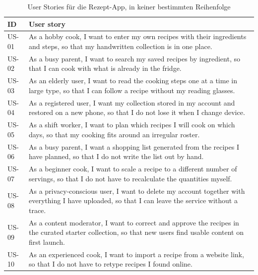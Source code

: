 \begin{table}[H]
  \centering
  \caption{User Stories für die Rezept-App, in keiner bestimmten Reihenfolge}
  \label{tab:user-stories}
  \tablefontsize
  \begin{tabular}{@{}p{1.2cm}p{13.5cm}@{}}
    \toprule
    \textbf{ID} & \textbf{User story} \\
    \midrule
    US-01 & As a hobby cook, I want to enter my own recipes with their
            ingredients and steps, so that my handwritten collection is in one
            place. \\
    US-02 & As a busy parent, I want to search my saved recipes by ingredient,
            so that I can cook with what is already in the fridge. \\
    US-03 & As an elderly user, I want to read the cooking steps one at a time
            in large type, so that I can follow a recipe without my reading
            glasses. \\
    US-04 & As a registered user, I want my collection stored in my account and
            restored on a new phone, so that I do not lose it when I change
            device. \\
    US-05 & As a shift worker, I want to plan which recipes I will cook on which
            days, so that my cooking fits around an irregular roster. \\
    US-06 & As a busy parent, I want a shopping list generated from the recipes
            I have planned, so that I do not write the list out by hand. \\
    US-07 & As a beginner cook, I want to scale a recipe to a different number
            of servings, so that I do not have to recalculate the quantities
            myself. \\
    US-08 & As a privacy-conscious user, I want to delete my account together
            with everything I have uploaded, so that I can leave the service
            without a trace. \\
    US-09 & As a content moderator, I want to correct and approve the recipes in
            the curated starter collection, so that new users find usable
            content on first launch. \\
    US-10 & As an experienced cook, I want to import a recipe from a website
            link, so that I do not have to retype recipes I found online. \\
    \bottomrule
  \end{tabular}
\end{table}
